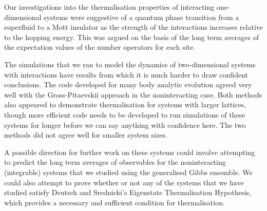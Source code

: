 \documentclass[a4paper, 10pt]{article}
\theoremstyle{plain}
\begin{document}
Our investigations into the thermalisation properties of interacting
one-dimensional systems were suggestive of a quantum phase transition from a
superfluid to a Mott insulator as the strength of the interactions increases
relative to the hopping energy. This was argued on the basis of the long term
averages of the expectation values of the number operators for each site.


The simulations that we ran to model the dynamics of two-dimensional systems
with interactions have results from which it is much harder to draw confident
conclusions. The code developed for many body analytic evolution agreed very
well with the Gross-Pitaevskii approach in the noninteracting case. Both methods
also appeared to demonstrate thermalisation for systems with larger lattices,
though more efficient code needs to be developed to run simulations of these
systems for longer before we can say anything with confidence here. The two
methods did not agree well for smaller system sizes.

A possible direction for further work on these systems could involve attempting
to predict the long term averages of observables for the noninteracting 
(integrable) systems that we studied using the generalised Gibbs ensemble. 
We could also attempt to prove whether or not
any of the systems that we have studied satisfy Deutsch and Srednicki's
Eigenstate Thermalisation Hypothesis, which provides a necessary and
sufficient condition for thermalisation.


\newpage


\end{document}
